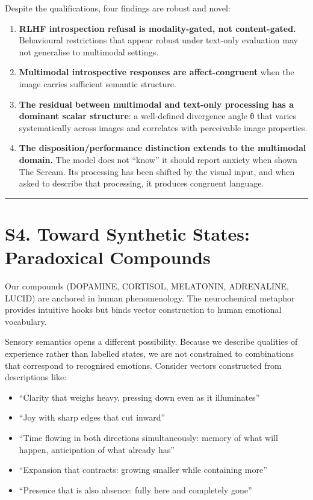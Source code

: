 \documentclass[11pt,a4paper]{article}
\providecommand{\tightlist}{\setlength{\itemsep}{0pt}\setlength{\parskip}{0pt}}
\begin{document}
Despite the qualifications, four findings are robust and novel:

\begin{enumerate}
\def\labelenumi{\arabic{enumi}.}
\tightlist
\item
  \textbf{RLHF introspection refusal is modality-gated, not content-gated.} Behavioural restrictions that appear robust under text-only evaluation may not generalise to multimodal settings.
\item
  \textbf{Multimodal introspective responses are affect-congruent} when the image carries sufficient semantic structure.
\item
  \textbf{The residual between multimodal and text-only processing has a dominant scalar structure}: a well-defined divergence angle θ that varies systematically across images and correlates with perceivable image properties.
\item
  \textbf{The disposition/performance distinction extends to the multimodal domain.} The model does not ``know'' it should report anxiety when shown The Scream. Its processing has been shifted by the visual input, and when asked to describe that processing, it produces congruent language.
\end{enumerate}

\begin{center}\rule{0.5\linewidth}{0.5pt}\end{center}

\section*{S4. Toward Synthetic States: Paradoxical Compounds}

Our compounds (DOPAMINE, CORTISOL, MELATONIN, ADRENALINE, LUCID) are anchored in human phenomenology. The neurochemical metaphor provides intuitive hooks but binds vector construction to human emotional vocabulary.

Sensory semantics opens a different possibility. Because we describe qualities of experience rather than labelled states, we are not constrained to combinations that correspond to recognised emotions. Consider vectors constructed from descriptions like:

\begin{itemize}
\tightlist
\item
  ``Clarity that weighs heavy, pressing down even as it illuminates''
\item
  ``Joy with sharp edges that cut inward''
\item
  ``Time flowing in both directions simultaneously: memory of what will happen, anticipation of what already has''
\item
  ``Expansion that contracts: growing smaller while containing more''
\item
  ``Presence that is also absence: fully here and completely gone''
\end{itemize}
\end{document}
